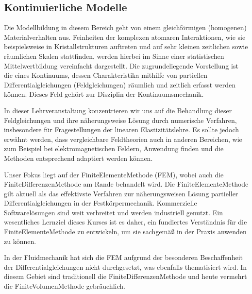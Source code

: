 \documentclass[letterpaper,10pt,german]{jupyterBook}
\begin{document}
\sphinxAtStartPar
{}



\sphinxAtStartPar
{}


\subsection{Kontinuierliche Modelle}
\label{\detokenize{chapters/chapter1/Einf_xfchrung_Modellklassifikation:kontinuierliche-modelle}}
\sphinxAtStartPar
Die Modellbildung in diesem Bereich geht von einem gleichförmigen (homogenen) Materialverhalten aus. Feinheiten der komplexen atomaren Interaktionen, wie sie beispielsweise in Kristallstrukturen auftreten und auf sehr kleinen zeitlichen sowie räumlichen Skalen stattfinden, werden hierbei im Sinne einer statistischen Mittelwertbildung vereinfacht dargestellt. Die zugrundeliegende Vorstellung ist die eines Kontinuums, dessen Charakteristika mithilfe von partiellen Differentialgleichungen (Feldgleichungen) räumlich und zeitlich erfasst werden können. Dieses Feld gehört zur Disziplin der Kontinuumsmechanik.

\sphinxAtStartPar
In dieser Lehrveranstaltung konzentrieren wir uns auf die Behandlung dieser Feldgleichungen und ihre näherungsweise Lösung durch numerische Verfahren, insbesondere für Fragestellungen der linearen Elastizitätslehre. Es sollte jedoch erwähnt werden, dass vergleichbare Feldtheorien auch in anderen Bereichen, wie zum Beispiel bei elektromagnetischen Feldern, Anwendung finden und die Methoden entsprechend adaptiert werden können.

\sphinxAtStartPar
Unser Fokus liegt auf der Finite\sphinxhyphen{}Elemente\sphinxhyphen{}Methode (FEM), wobei auch die Finite\sphinxhyphen{}Differenzen\sphinxhyphen{}Methode am Rande behandelt wird. Die Finite\sphinxhyphen{}Elemente\sphinxhyphen{}Methode gilt aktuell als das effektivste Verfahren zur näherungsweisen Lösung partieller Differentialgleichungen in der Festkörpermechanik. Kommerzielle Softwarelösungen sind weit verbreitet und werden industriell genutzt. Ein wesentliches Lernziel dieses Kurses ist es daher, ein fundiertes Verständnis für die Finite\sphinxhyphen{}Elemente\sphinxhyphen{}Methode zu entwickeln, um sie sachgemäß in der Praxis anwenden zu können.

\sphinxAtStartPar
In der Fluidmechanik hat sich die FEM aufgrund der besonderen Beschaffenheit der Differentialgleichungen nicht durchgesetzt, was ebenfalls thematisiert wird. In diesem Gebiet sind traditionell die Finite\sphinxhyphen{}Differenzen\sphinxhyphen{}Methode und heute vermehrt die Finite\sphinxhyphen{}Volumen\sphinxhyphen{}Methode gebräuchlich.
\end{document}
